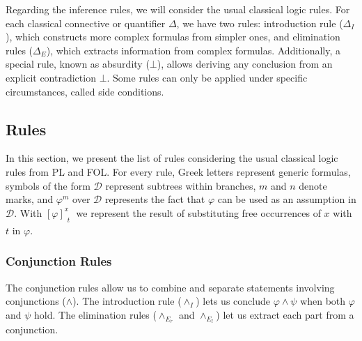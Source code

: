 Regarding the inference rules, we will consider the usual classical logic rules. For each classical connective or quantifier $\Delta$, we have two rules: introduction rule ($\Delta_I$), which constructs more complex formulas from simpler ones, and elimination rules ($\Delta_E$), which extracts information from complex formulas. Additionally, a special rule, known as absurdity (\(\bot\)), allows deriving any conclusion from an explicit contradiction $\bot$. Some rules can only be applied under specific circumstances, called side conditions. %

\subsection{Rules}
\label{nd:rules} 
In this section, we present the list of rules considering the usual classical logic rules from \gls{PL} and \gls{FOL}. For every rule, Greek letters represent generic formulas, symbols of the form \( \mathcal{D} \) represent subtrees within branches, \( m \) and \( n \) denote marks, and \(\displaystyle \varphi^m\) over \( \mathcal{D} \) represents the fact that $\varphi$ can be used as an assumption in \( \mathcal{D} \). With \(\displaystyle \left[ \varphi \right]^x_{\substack{t}}\) we represent the result of substituting free occurrences of $x$ with $t$ in $\varphi$.%

\subsubsection*{Conjunction Rules}

The conjunction rules allow us to combine and separate statements involving conjunctions (\(\land\)). The introduction rule (\(\land_I\)) lets us conclude \(\varphi \land \psi\) when both \(\varphi\) and \(\psi\) hold. The elimination rules (\(\land_{E_r}\) and \(\land_{E_l}\)) let us extract each part from a conjunction.

\vspace{0.5cm}

